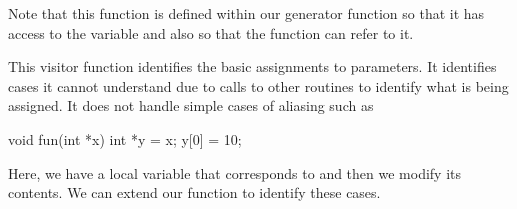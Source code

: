Note that this function is defined within our generator function so
that it has access to the  variable and also so
that the  function can refer to it.

This visitor function identifies the basic assignments to 
parameters.  It identifies cases it cannot understand due to calls to
other routines to identify what is being assigned. 
It does not handle simple cases of aliasing such as
\begin{CCode}
void fun(int *x)
{
  int *y = x;
  y[0] = 10;
}
\end{CCode}
Here, we have a local variable that corresponds to  and then
we modify its contents.  We can extend our function to identify these
cases.


